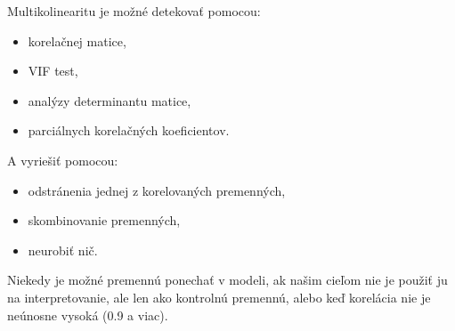 \documentclass[]{article}
\providecommand{\tightlist}{%
  \setlength{\itemsep}{0pt}\setlength{\parskip}{0pt}}
\begin{document}
Multikolinearitu je možné detekovať pomocou:

\begin{itemize}
\tightlist
\item
  korelačnej matice,
\item
  VIF test,
\item
  analýzy determinantu matice,
\item
  parciálnych korelačných koeficientov.
\end{itemize}

A vyriešiť pomocou:

\begin{itemize}
\tightlist
\item
  odstránenia jednej z korelovaných premenných,
\item
  skombinovanie premenných,
\item
  neurobiť nič.
\end{itemize}

Niekedy je možné premennú ponechať v modeli, ak našim cieľom nie je
použiť ju na interpretovanie, ale len ako kontrolnú premennú, alebo keď
korelácia nie je neúnosne vysoká (0.9 a viac).
\end{document}
